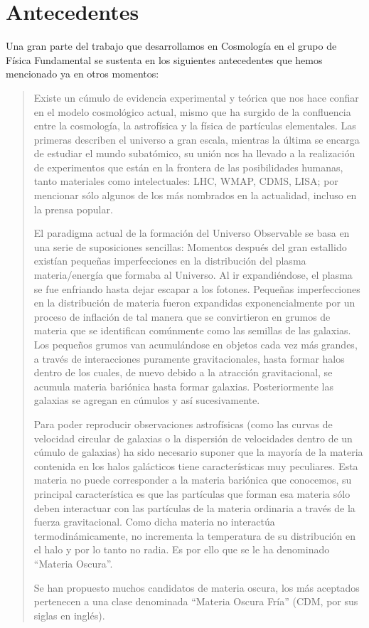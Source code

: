 \documentclass[12pt,spanish]{article}
\begin{document}
\section*{Antecedentes}

Una gran parte del trabajo que desarrollamos en Cosmología en el grupo
de Física Fundamental se sustenta en los siguientes antecedentes que
hemos mencionado ya en otros momentos:

\begin{quote}

Existe un cúmulo de evidencia experimental y teórica
que nos hace  
confiar en el modelo cosmológico actual, mismo que  ha surgido de
la confluencia entre la cosmología, la astrofísica y la física
de partículas elementales. Las primeras describen el universo a gran
escala, mientras la última se encarga de estudiar el mundo
subatómico, su unión nos ha llevado a la realización de
experimentos que están en la frontera de las posibilidades humanas,
tanto materiales como intelectuales: LHC, WMAP, CDMS, LISA; por
mencionar sólo algunos de los más nombrados en la actualidad,
incluso en la prensa popular.

El paradigma actual de la formación del Universo Observable se 
basa en una serie de suposiciones sencillas: Momentos después del 
gran estallido existían pequeñas imperfecciones en la 
distribución del plasma materia/energía que formaba al Universo.
Al ir expandiéndose, el plasma se fue enfriando hasta dejar escapar 
a los fotones. Pequeñas imperfecciones en la distribución de
materia fueron 
expandidas exponencialmente por un proceso de inflación de tal 
manera que se convirtieron en grumos de materia que se 
identifican comúnmente como las semillas de las galaxias. Los 
pequeños grumos van acumulándose en objetos cada vez más 
grandes, a través de interacciones puramente 
gravitacionales,  hasta formar halos dentro de los cuales, de nuevo 
debido a la atracción gravitacional, se acumula materia 
bariónica hasta formar galaxias. Posteriormente las galaxias se 
agregan en cúmulos y así sucesivamente.

Para poder reproducir observaciones astrofísicas (como las 
curvas de velocidad circular de galaxias o la dispersión de 
velocidades dentro de un cúmulo de galaxias) ha sido necesario 
suponer que la mayoría de la materia contenida en los halos 
galácticos tiene características muy peculiares. Esta materia 
no puede corresponder a la materia bariónica que conocemos, 
su principal característica es que las partículas que forman 
esa materia sólo deben interactuar con las partículas de la 
materia ordinaria a través de la fuerza gravitacional. Como 
dicha materia no interactúa  termodinámicamente, no incrementa 
la temperatura de su distribución en el halo y por lo tanto no 
radia. Es por ello que se le ha denominado ``Materia Oscura''.

Se han propuesto muchos candidatos de materia oscura, los más 
aceptados pertenecen a una clase denominada ``Materia Oscura 
Fría'' (CDM, por sus siglas en inglés). 


\end{quote}
\end{document}
